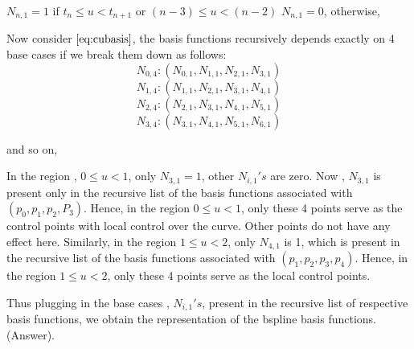\documentclass{article}
\begin{document}
$N_{n,1} = 1$ if $t_n \leq u < t_{n+1}$ or $(n-3) \leq u < (n-2)$ \newline
$N_{n,1} = 0$, otherwise, \newline \newline

Now consider $\eqref{eq:cubasis}$, the basis functions recursively depends exactly on 4 base cases if we break them down as follows: \newline
\[ N_{0,4} : (N_{0,1}, N_{1,1}, N_{2,1}, N_{3,1})\]
\[ N_{1,4} : ( N_{1,1}, N_{2,1}, N_{3,1}, N_{4,1})\]
\[ N_{2,4} : ( N_{2,1}, N_{3,1}, N_{4,1}, N_{5,1})\]
\[ N_{3,4} : ( N_{3,1}, N_{4,1}, N_{5,1}, N_{6,1})\]

and so on, \newline

In the region , $0 \leq u < 1$, only $N_{3,1}=1$, other $N_{i,1}'s$ are zero. Now , $N_{3,1}$ is present only in the recursive list of the basis functions associated with  $(p_0, p_1, p_2, P_3)$. Hence, in the region $0 \leq u < 1$, only these 4 points serve as the control points with local control over the curve. Other points do not have any effect here. Similarly, in the region $1 \leq u < 2$, only $N_{4,1}$ is 1, which is present in the recursive list of the basis functions associated with $(p_1, p_2, p_3,p_4)$. Hence, in the region $1 \leq u < 2$, only these 4 points serve as the local control points. \newline

Thus plugging in the base cases , $N_{i,1}'s$, present in the recursive list of respective basis functions, we obtain the representation of the bspline basis functions. (Answer). \newline
\end{document}
